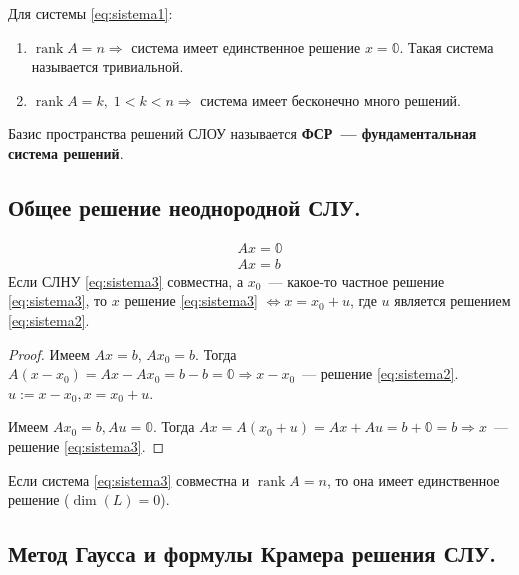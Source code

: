 \documentclass[10pt]{article}
\begin{document}
\begin{corollary} Для системы \eqref{eq:sistema1}:
\begin{enumerate}
    \item $\operatorname{rank} A = n \Rightarrow$ система имеет единственное решение $x = \mathbb{0}$. Такая система называется тривиальной.
    \item $\operatorname{rank} A = k, \; 1 < k < n \Rightarrow$ система имеет бесконечно много решений.
\end{enumerate}
\end{corollary}

\begin{definition}
    Базис пространства решений СЛОУ называется \textbf{ФСР~--- фундаментальная система решений}.
\end{definition}

\subsection*{Общее решение неоднородной СЛУ.}

\begin{theorem}
\begin{align}
    Ax = \mathbb{0} \tag{1}\label{eq:sistema2} \\
    Ax = b \tag{2}\label{eq:sistema3}
\end{align}
Если СЛНУ \eqref{eq:sistema3} совместна, а $x_0$~--- какое-то частное решение \eqref{eq:sistema3}, то $x$ решение \eqref{eq:sistema3} $\Leftrightarrow x = x_0 + u$, где $u$ является решением \eqref{eq:sistema2}.
\end{theorem}

\begin{proof}
    \fbox{$\Rightarrow$} Имеем $Ax = b$, $A x_0 = b$. Тогда $A (x - x_0) = Ax - Ax_0 = b - b = \mathbb{0} \Rightarrow x-x_0$~--- решение \eqref{eq:sistema2}. $u := x-x_0, x = x_0 + u$.

    \fbox{$\Leftarrow$} Имеем $A x_0 = b, A u = \mathbb{0}$. Тогда $A x = A (x_0 + u) = A x + Au = b + \mathbb{0} = b \Rightarrow x$~--- решение \eqref{eq:sistema3}.
\end{proof}

\begin{corollary}
    Если система \eqref{eq:sistema3} совместна и $\operatorname{rank} A = n$, то она имеет единственное решение ($\operatorname{dim}(L) = 0$).
\end{corollary}

\subsection*{Метод Гаусса и формулы Крамера решения СЛУ.}
\end{document}
